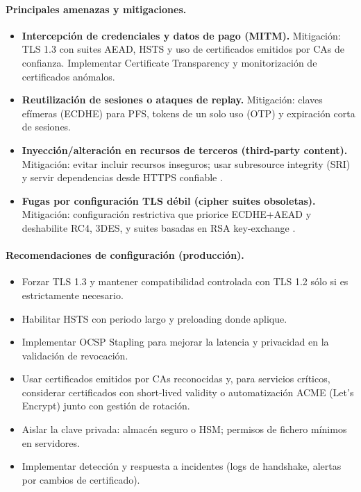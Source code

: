 \paragraph{Principales amenazas y mitigaciones.}
\begin{itemize}
    \item \textbf{Intercepción de credenciales y datos de pago (MITM).} Mitigación: TLS 1.3 con suites AEAD, HSTS y uso de certificados emitidos por CAs de confianza. Implementar Certificate Transparency y monitorización de certificados anómalos.
    \item \textbf{Reutilización de sesiones o ataques de replay.} Mitigación: claves efímeras (ECDHE) para PFS, tokens de un solo uso (OTP) y expiración corta de sesiones.
    \item \textbf{Inyección/alteración en recursos de terceros (third-party content).} Mitigación: evitar incluir recursos inseguros; usar subresource integrity (SRI) y servir dependencias desde HTTPS confiable \cite{nikiforakis2012}.
    \item \textbf{Fugas por configuración TLS débil (cipher suites obsoletas).} Mitigación: configuración restrictiva que priorice ECDHE+AEAD y deshabilite RC4, 3DES, y suites basadas en RSA key-exchange \cite{rfc7525}.
\end{itemize}

\paragraph{Recomendaciones de configuración (producción).}
\begin{itemize}
    \item Forzar TLS 1.3 y mantener compatibilidad controlada con TLS 1.2 sólo si es estrictamente necesario.
    \item Habilitar HSTS con periodo largo y preloading donde aplique.
    \item Implementar OCSP Stapling para mejorar la latencia y privacidad en la validación de revocación.
    \item Usar certificados emitidos por CAs reconocidas y, para servicios críticos, considerar certificados con short-lived validity o automatización ACME (Let's Encrypt) junto con gestión de rotación.
    \item Aislar la clave privada: almacén seguro o HSM; permisos de fichero mínimos en servidores.
    \item Implementar detección y respuesta a incidentes (logs de handshake, alertas por cambios de certificado).
\end{itemize}

